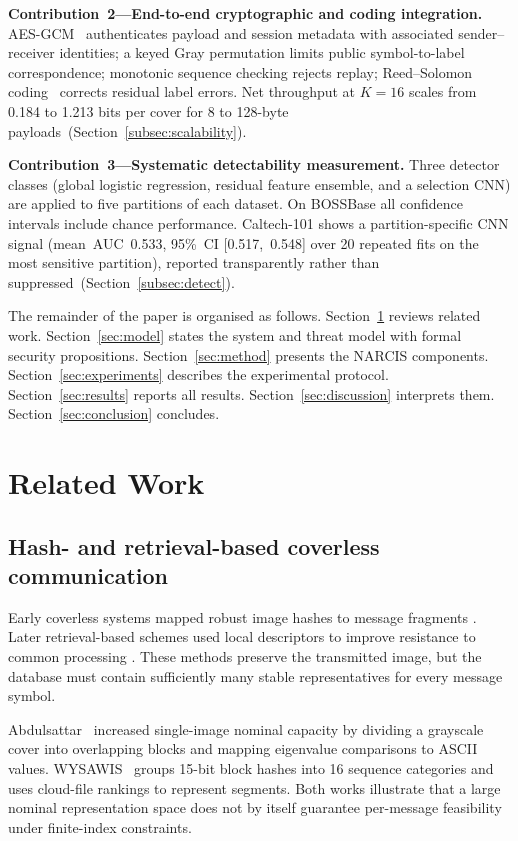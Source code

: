 ﻿\documentclass[10pt,journal]{IEEEtran}
\newcommand{\method}{NARCIS\xspace}
\begin{document}
\textbf{Contribution~2---End-to-end cryptographic and coding
integration.} AES-GCM~\cite{nist2007gcm} authenticates payload and
session metadata with associated sender--receiver identities; a keyed
Gray permutation limits public symbol-to-label correspondence;
monotonic sequence checking rejects replay; Reed--Solomon
coding~\cite{reed1960polynomial} corrects residual label errors. Net
throughput at $K{=}16$ scales from 0.184 to 1.213 bits per cover for
8 to 128-byte payloads~(Section~\ref{subsec:scalability}).

\textbf{Contribution~3---Systematic detectability measurement.} Three
detector classes (global logistic regression, residual feature ensemble,
and a selection CNN) are applied to five partitions of each dataset. On
BOSSBase all confidence intervals include chance performance. Caltech-101
shows a partition-specific CNN signal (mean~AUC~0.533, 95\%~CI
[0.517,~0.548] over 20 repeated fits on the most sensitive partition),
reported transparently rather than suppressed~(Section~\ref{subsec:detect}).

The remainder of the paper is organised as follows. Section~\ref{sec:related}
reviews related work. Section~\ref{sec:model} states the system and threat
model with formal security propositions. Section~\ref{sec:method}
presents the \method components. Section~\ref{sec:experiments} describes
the experimental protocol. Section~\ref{sec:results} reports all results.
Section~\ref{sec:discussion} interprets them. Section~\ref{sec:conclusion}
concludes.

\section{Related Work}
\label{sec:related}

\subsection{Hash- and retrieval-based coverless communication}

Early coverless systems mapped robust image hashes to message fragments
\cite{zhou2015coverless,zheng2017hashing}. Later retrieval-based schemes
used local descriptors to improve resistance to common processing
\cite{li2024surf}. These methods preserve the transmitted image, but
the database must contain sufficiently many stable representatives for
every message symbol.

Abdulsattar~\cite{abdulsattar2021} increased single-image nominal
capacity by dividing a grayscale cover into overlapping blocks and
mapping eigenvalue comparisons to ASCII values. WYSAWIS~\cite{wysawis2025}
groups 15-bit block hashes into 16 sequence categories and uses
cloud-file rankings to represent segments. Both works illustrate that
a large nominal representation space does not by itself guarantee
per-message feasibility under finite-index constraints.
\end{document}
